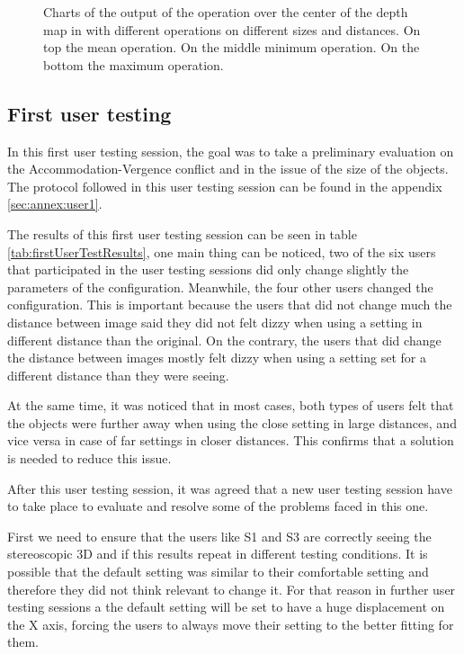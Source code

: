 \documentclass[10pt,a4paper,twocolumn,twoside]{article}
\begin{document}
\begin{figure}
\begin{subfigure}[t]{0.5\textwidth}
		\end{subfigure}
		\caption{ Charts of the output of the operation over the center of the depth map in with different operations on different sizes and distances. On top the mean operation. On the middle minimum operation. On the bottom the maximum operation. }
		\label{fig:output}
	\end{figure}
	
	\subsection{First user testing}
	
	In this first user testing session, the goal was to take a preliminary evaluation on the Accommodation-Vergence conflict and in the issue of the size of the objects. The protocol followed in this user testing session can be found in the appendix \ref{sec:annex:user1}.
	
	The results of this first user testing session can be seen in table \ref{tab:firstUserTestResults}, one main thing can be noticed, two of the six users that participated in the user testing sessions did only change slightly the parameters of the configuration. Meanwhile, the four other users changed the configuration. This is important because the users that did not change much the distance between image said they did not felt dizzy when using a setting in different distance than the original. On the contrary, the users that did change the distance between images mostly felt dizzy when using a setting set for a different distance than they were seeing.
	
	At the same time, it was noticed that in most cases, both types of users felt that the objects were further away when using the close setting in large distances, and vice versa in case of far settings in closer distances. This confirms that a solution is needed to reduce this issue. 
	
	After this user testing session, it was agreed that a new user testing session have to take place to evaluate and resolve some of the problems faced in this one. 

	First we need to ensure that the users like S1 and S3 are correctly seeing the stereoscopic 3D and if this results repeat in different testing conditions. It is possible that the default setting was similar to their comfortable setting and therefore they did not think relevant to change it. For that reason in further user testing sessions a the default setting will be set to have a huge displacement on the X axis, forcing the users to always move their setting to the better fitting for them.
	
\end{document}
